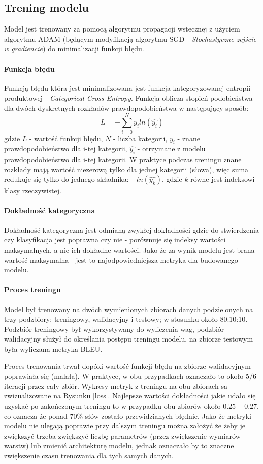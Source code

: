 \subsection{Trening modelu}
Model jest trenowany za pomocą algorytmu propagacji wstecznej \cite{BackProp} z użyciem algorytmu ADAM \cite{ADAM} (będącym modyfikacją algorytmu SGD - \textit{Stochastyczne zejście w gradiencie}) do minimalizacji funkcji błędu.

\paragraph{Funkcja błędu}
Funkcją błędu która jest minimalizowana jest funkcja kategoryzowanej entropii produktowej - \textit{Categorical Cross Entropy}. Funkcja oblicza stopień podobieństwa dla dwóch dyskretnych rozkładów prawdopodobieństwa w następujący sposób: 
\begin{equation*}
L = - \sum_{i=0}^N y_iln(\hat{y_i})
\end{equation*}
gdzie $L$ - wartość funkcji błędu, $N$ - liczba kategorii, $y_i$ - znane prawdopodobieństwo dla i-tej kategorii, $\hat{y_i}$ - otrzymane z modelu prawdopodobieństwo dla i-tej kategorii. W praktyce podczas treningu znane rozkłady mają wartość niezerową tylko dla jednej kategorii (słowa), więc suma redukuje się tylko do jednego składnika: $-ln(\hat{y_k})$, gdzie $k$ równe jest indeksowi klasy rzeczywistej.

\paragraph{Dokładność kategoryczna}
Dokładność kategoryczna jest odmianą zwykłej dokładności gdzie do stwierdzenia czy klasyfikacja jest poprawna czy nie - porównuje się indeksy wartości maksymalnych, a nie ich dokładne wartości. Jako że za wynik modelu jest brana wartość maksymalna - jest to najodpowiedniejsza metryka dla budowanego modelu.

\paragraph{Proces treningu}
Model był trenowany na dwóch wymienionych zbiorach danych podzielonych na trzy podzbiory: treningowy, walidacyjny i testowy; w stosunku około 80:10:10. Podzbiór treningowy był wykorzystywany do wyliczenia wag, podzbiór walidacyjny służył do określania postępu treningu modelu, na zbiorze testowym była wyliczana metryka BLEU.

Proces trenowania trwał dopóki wartość funkcji błędu na zbiorze walidacyjnym poprawiała się (malała). W praktyce, w obu przypadkach oznaczało to około 5/6 iteracji przez cały zbiór. Wykresy metryk z treningu na obu zbiorach sa zwizualizowane na Rysunku \ref{loss}. Najlepsze wartości dokładności jakie udało się uzyskać po zakończonym treningu to w przypadku obu zbiorów około $0.25 - 0.27$, co oznacza że ponad $70\%$ słów zostało przewidzianych błędnie. Jako że metryki modelu nie ulegają poprawie przy dalszym treningu można założyć że żeby je zwiększyć trzeba zwiększyć liczbę parametrów (przez zwiększenie wymiarów warstw) lub zmienić architekturę modelu, jednak oznaczało by to znaczne zwiększenie czasu trenowania dla tych samych danych.

